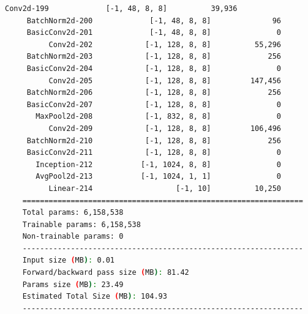\documentclass[a4paper, 12pt]{article}
\begin{document}
\begin{lstlisting}[language=sh]
          Conv2d-199             [-1, 48, 8, 8]          39,936
     BatchNorm2d-200             [-1, 48, 8, 8]              96
     BasicConv2d-201             [-1, 48, 8, 8]               0
          Conv2d-202            [-1, 128, 8, 8]          55,296
     BatchNorm2d-203            [-1, 128, 8, 8]             256
     BasicConv2d-204            [-1, 128, 8, 8]               0
          Conv2d-205            [-1, 128, 8, 8]         147,456
     BatchNorm2d-206            [-1, 128, 8, 8]             256
     BasicConv2d-207            [-1, 128, 8, 8]               0
       MaxPool2d-208            [-1, 832, 8, 8]               0
          Conv2d-209            [-1, 128, 8, 8]         106,496
     BatchNorm2d-210            [-1, 128, 8, 8]             256
     BasicConv2d-211            [-1, 128, 8, 8]               0
       Inception-212           [-1, 1024, 8, 8]               0
       AvgPool2d-213           [-1, 1024, 1, 1]               0
          Linear-214                   [-1, 10]          10,250
    ================================================================
    Total params: 6,158,538
    Trainable params: 6,158,538
    Non-trainable params: 0
    ----------------------------------------------------------------
    Input size (MB): 0.01
    Forward/backward pass size (MB): 81.42
    Params size (MB): 23.49
    Estimated Total Size (MB): 104.93
    ----------------------------------------------------------------
\end{lstlisting}
\end{document}
